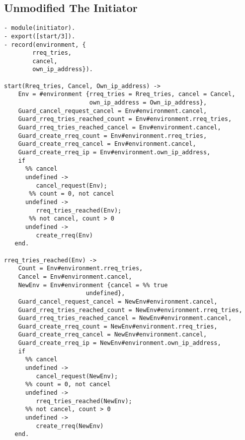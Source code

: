 \subsection*{Unmodified The Initiator}

\footnotesize
\begin{verbatim}
- module(initiator).
- export([start/3]).
- record(environment, {
        rreq_tries,
        cancel,
        own_ip_address}).

start(Rreq_tries, Cancel, Own_ip_address) -> 
    Env = #environment {rreq_tries = Rreq_tries, cancel = Cancel, 
                        own_ip_address = Own_ip_address},
    Guard_cancel_request_cancel = Env#environment.cancel,
    Guard_rreq_tries_reached_count = Env#environment.rreq_tries,
    Guard_rreq_tries_reached_cancel = Env#environment.cancel,
    Guard_create_rreq_count = Env#environment.rreq_tries,
    Guard_create_rreq_cancel = Env#environment.cancel,
    Guard_create_rreq_ip = Env#environment.own_ip_address,
    if
      %% cancel
      undefined ->
         cancel_request(Env);
       %% count = 0, not cancel
      undefined ->
         rreq_tries_reached(Env);
       %% not cancel, count > 0
      undefined ->
         create_rreq(Env)
   end.

rreq_tries_reached(Env) -> 
    Count = Env#environment.rreq_tries,
    Cancel = Env#environment.cancel,
    NewEnv = Env#environment {cancel = %% true
                       undefined},
    Guard_cancel_request_cancel = NewEnv#environment.cancel,
    Guard_rreq_tries_reached_count = NewEnv#environment.rreq_tries,
    Guard_rreq_tries_reached_cancel = NewEnv#environment.cancel,
    Guard_create_rreq_count = NewEnv#environment.rreq_tries,
    Guard_create_rreq_cancel = NewEnv#environment.cancel,
    Guard_create_rreq_ip = NewEnv#environment.own_ip_address,
    if
      %% cancel
      undefined ->
         cancel_request(NewEnv);
      %% count = 0, not cancel
      undefined ->
         rreq_tries_reached(NewEnv);
      %% not cancel, count > 0
      undefined ->
         create_rreq(NewEnv)
   end.


\end{verbatim}
